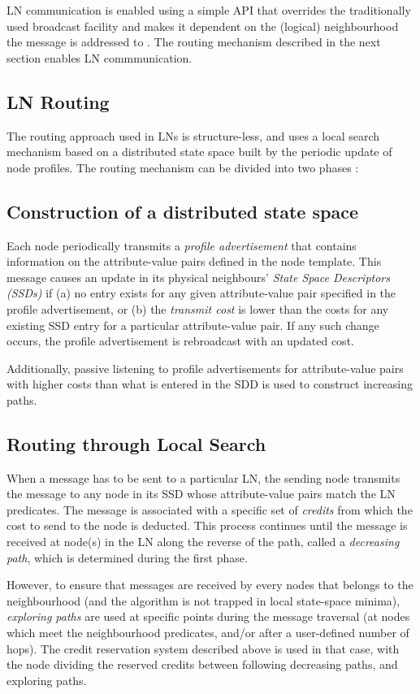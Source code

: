 LN communication is enabled using a simple API that overrides the
traditionally used broadcast facility and makes it dependent on the (logical)
neighbourhood the message is addressed to \cite{mottola_LN:2006}. The routing mechanism described in
the next section enables LN commmunication.

\subsection{LN Routing}

The routing approach used in LNs is structure-less, and uses a local search
mechanism based on a distributed state space built by the periodic update of
node profiles. The routing mechanism can be divided into two phases \cite{mottola_LNAbstraction}:

\subsection{Construction of a distributed state space}
Each node periodically transmits a \emph{profile advertisement} that contains
information on the attribute-value pairs defined in the node template. This
message causes an update in its physical neighbours' \emph{State Space
Descriptors (SSDs)} if (a) no entry exists for any given attribute-value pair
specified in the profile advertisement, or (b) the \emph{transmit cost} is lower
than the costs for any existing SSD entry for a particular attribute-value pair.
If any such change occurs, the profile advertisement is rebroadcast with an
updated cost.

Additionally, passive listening to profile advertisements for attribute-value
pairs with higher costs than what is entered in the SDD is used to construct
increasing paths.

\subsection{ Routing through Local Search}
When a message has to be sent to a particular LN, the sending node transmits the
message to any node in its SSD whose attribute-value pairs match the LN
predicates. The message is associated with a specific set of \emph{credits} from
which the cost to send to the node is deducted. This process continues until the
message is received at node(s) in the LN along the reverse of the path, called
a \emph{decreasing path}, which is determined during the first phase. 

However, to ensure that messages are received by every nodes that belongs to the
neighbourhood (and the algorithm is not trapped in local state-space minima),
\emph{exploring paths} are used at specific points during the message traversal
(at nodes which meet the neighbourhood predicates, and/or after a user-defined
number of hops). The credit reservation system described above is used in that
case, with the node dividing the reserved credits between following decreasing
paths, and exploring paths.

